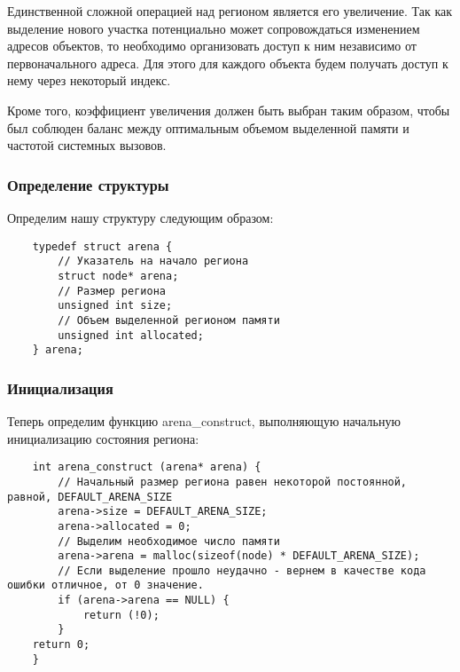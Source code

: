 Единственной сложной операцией над регионом является его увеличение. Так как выделение нового участка потенциально может сопровождаться изменением адресов объектов, то необходимо организовать доступ к ним независимо от первоначального адреса. Для этого для каждого объекта будем получать доступ к нему через некоторый индекс.

Кроме того, коэффициент увеличения должен быть выбран таким образом, чтобы был соблюден баланс между оптимальным объемом выделенной памяти и частотой системных вызовов.

\subsubsection{Определение структуры}
Определим нашу структуру следующим образом:
\begin{verbatim}
    typedef struct arena {
        // Указатель на начало региона
        struct node* arena;
        // Размер региона
        unsigned int size;
        // Объем выделенной регионом памяти
        unsigned int allocated;
    } arena;
\end{verbatim}

\subsubsection{Инициализация}
Теперь определим функцию arena_construct, выполняющую начальную инициализацию состояния региона:
\begin{verbatim}
    int arena_construct (arena* arena) {
        // Начальный размер региона равен некоторой постоянной, равной, DEFAULT_ARENA_SIZE
        arena->size = DEFAULT_ARENA_SIZE;
        arena->allocated = 0;
        // Выделим необходимое число памяти
        arena->arena = malloc(sizeof(node) * DEFAULT_ARENA_SIZE);
        // Если выделение прошло неудачно - вернем в качестве кода ошибки отличное, от 0 значение.
        if (arena->arena == NULL) {
            return (!0);
        }
    return 0;
    }
\end{verbatim}

